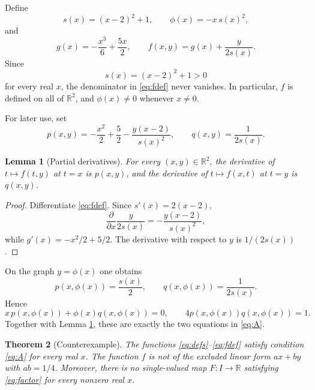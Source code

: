 \documentclass[11pt]{article}
\newtheorem{theorem}{Theorem}[section]
\newtheorem{lemma}[theorem]{Lemma}
\theoremstyle{remark}
\begin{document}
Define
\begin{equation}\label{eq:defs}
 s(x)=(x-2)^2+1,
 \qquad
 \phi(x)=-x\,s(x)^2,
\end{equation}
and
\begin{equation}\label{eq:fdef}
 g(x)=-\frac{x^3}{6}+\frac{5x}{2},
 \qquad
 f(x,y)=g(x)+\frac{y}{2s(x)}.
\end{equation}
Since
\begin{equation}\label{eq:spos}
 s(x)=(x-2)^2+1>0
\end{equation}
for every real $x$, the denominator in \eqref{eq:fdef} never vanishes.  In particular, $f$ is defined on all of $\mathbb R^2$, and $\phi(x)\ne0$ whenever $x\ne0$.

For later use, set
\begin{equation}\label{eq:partials}
 p(x,y)=-\frac{x^2}{2}+\frac52-\frac{y(x-2)}{s(x)^2},
 \qquad
 q(x,y)=\frac1{2s(x)}.
\end{equation}

\begin{lemma}[Partial derivatives]\label{lem:partials}
For every $(x,y)\in\mathbb R^2$, the derivative of $t\mapsto f(t,y)$ at $t=x$ is $p(x,y)$, and the derivative of $t\mapsto f(x,t)$ at $t=y$ is $q(x,y)$.
\end{lemma}

\begin{proof}
Differentiate \eqref{eq:fdef}.  Since $s'(x)=2(x-2)$,
\[
 \frac{\partial}{\partial x}\frac{y}{2s(x)}
 =-\frac{y(x-2)}{s(x)^2},
\]
while $g'(x)=-x^2/2+5/2$.  The derivative with respect to $y$ is $1/(2s(x))$.
\end{proof}

On the graph $y=\phi(x)$ one obtains
\begin{equation}\label{eq:oncurvepartials}
 p(x,\phi(x))=\frac{s(x)}2,
 \qquad
 q(x,\phi(x))=\frac1{2s(x)}.
\end{equation}
Hence
\begin{equation}\label{eq:Averified}
 x\,p(x,\phi(x))+\phi(x)q(x,\phi(x))=0,
 \qquad
 4p(x,\phi(x))q(x,\phi(x))=1.
\end{equation}
Together with Lemma \ref{lem:partials}, these are exactly the two equations in \eqref{eq:A}.

\begin{theorem}[Counterexample]\label{thm:counterexample}
The functions \eqref{eq:defs}--\eqref{eq:fdef} satisfy condition \eqref{eq:A} for every real $x$.  The function $f$ is not of the excluded linear form $ax+by$ with $ab=1/4$.  Moreover, there is no single-valued map $F:I\to\mathbb R$ satisfying \eqref{eq:factor} for every nonzero real $x$.
\end{theorem}
\end{document}
